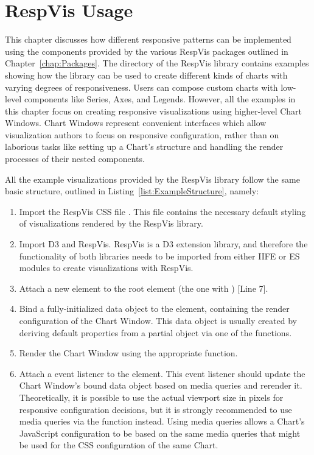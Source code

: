 \chapter{RespVis Usage}
\label{chap:Usage}

This chapter discusses how different responsive patterns can be
implemented using the components provided by the various RespVis
packages outlined in Chapter~\ref{chap:Packages}. The
 directory of the RespVis library contains examples
showing how the library can be used to create different kinds of
charts with varying degrees of responsiveness. Users can compose
custom charts with low-level components like Series, Axes, and
Legends. However, all the examples in this chapter focus on creating
responsive visualizations using higher-level Chart Windows. Chart
Windows represent convenient interfaces which allow visualization
authors to focus on responsive configuration, rather than on laborious
tasks like setting up a Chart's structure and handling the render
processes of their nested components.

All the example visualizations provided by the RespVis library follow
the same basic structure, outlined in
Listing~\ref{list:ExampleStructure}, namely:
\begin{enumerate}
\item Import the RespVis CSS file . This file
  contains the necessary default styling of visualizations rendered by
  the RespVis library.

\item Import D3 and RespVis. RespVis is a D3 extension library, and
  therefore the functionality of both libraries needs to be imported
  from either IIFE or ES modules to create visualizations with
  RespVis.

\item Attach a new  element to the root 
  element (the one with ) [Line 7].

\item Bind a fully-initialized data object to the  element,
  containing the render configuration of the Chart Window. This data
  object is usually created by deriving default properties from a
  partial object via one of the  functions.

\item Render the Chart Window using the appropriate
   function.

\item Attach a  event listener to the 
  element. This event listener should update the Chart Window's bound
  data object based on media queries and rerender it. Theoretically,
  it is possible to use the actual viewport size in pixels for
  responsive configuration decisions, but it is strongly recommended
  to use media queries via the  function
  instead. Using media queries allows a Chart's JavaScript
  configuration to be based on the same media queries that might be
  used for the CSS configuration of the same Chart.
\end{enumerate}



